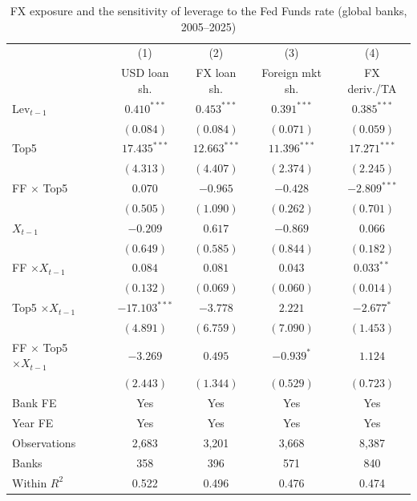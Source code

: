 \begin{table}[htbp]
\centering
\small
\begin{threeparttable}
\caption{FX exposure and the sensitivity of leverage to the Fed Funds rate (global banks, 2005--2025)}
\label{tab:cr_fx}
\begin{tabular}{lcccc}
\toprule
 & (1) & (2) & (3) & (4) \\
 & USD loan sh. & FX loan sh. & Foreign mkt sh. & FX deriv./TA \\
\midrule
Lev$_{t-1}$ & $0.410^{***}$ & $0.453^{***}$ & $0.391^{***}$ & $0.385^{***}$ \\
 & $(0.084)$ & $(0.084)$ & $(0.071)$ & $(0.059)$ \\[2pt]
Top5 & $17.435^{***}$ & $12.663^{***}$ & $11.396^{***}$ & $17.271^{***}$ \\
 & $(4.313)$ & $(4.407)$ & $(2.374)$ & $(2.245)$ \\[2pt]
FF $\times$ Top5 & $0.070$ & $-0.965$ & $-0.428$ & $-2.809^{***}$ \\
 & $(0.505)$ & $(1.090)$ & $(0.262)$ & $(0.701)$ \\[2pt]
$X_{t-1}$ & $-0.209$ & $0.617$ & $-0.869$ & $0.066$ \\
 & $(0.649)$ & $(0.585)$ & $(0.844)$ & $(0.182)$ \\[2pt]
FF $\times X_{t-1}$ & $0.084$ & $0.081$ & $0.043$ & $0.033^{**}$ \\
 & $(0.132)$ & $(0.069)$ & $(0.060)$ & $(0.014)$ \\[2pt]
Top5 $\times X_{t-1}$ & $-17.103^{***}$ & $-3.778$ & $2.221$ & $-2.677^{*}$ \\
 & $(4.891)$ & $(6.759)$ & $(7.090)$ & $(1.453)$ \\[2pt]
FF $\times$ Top5 $\times X_{t-1}$ & $-3.269$ & $0.495$ & $-0.939^{*}$ & $1.124$ \\
 & $(2.443)$ & $(1.344)$ & $(0.529)$ & $(0.723)$ \\
\midrule
Bank FE & Yes & Yes & Yes & Yes \\
Year FE & Yes & Yes & Yes & Yes \\
Observations & 2,683 & 3,201 & 3,668 & 8,387 \\
Banks & 358 & 396 & 571 & 840 \\
Within $R^2$ & 0.522 & 0.496 & 0.476 & 0.474 \\
\bottomrule
\end{tabular}
\begin{tablenotes}[flushleft]
\footnotesize

\end{tablenotes}
\end{threeparttable}
\end{table}
